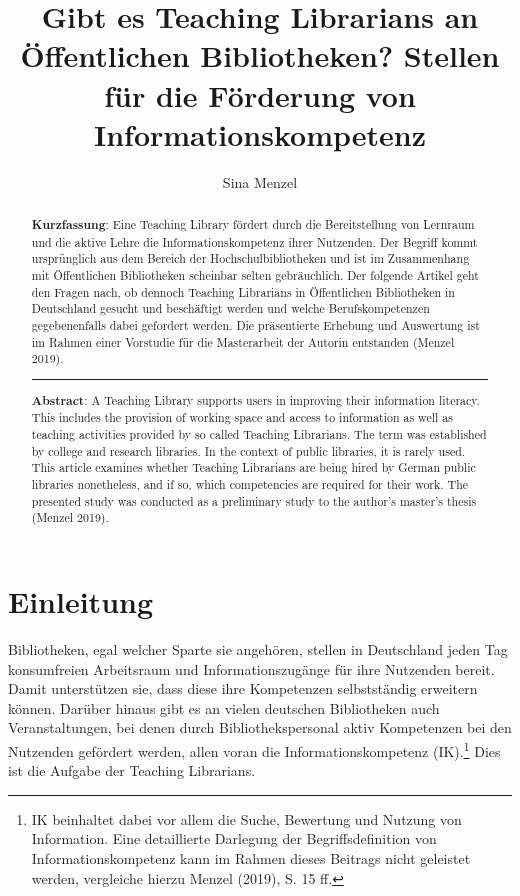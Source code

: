 \documentclass[a4paper,
fontsize=11pt,
oneside,
numbers=noperiodatend,
parskip=half-,
bibliography=totoc,
final
]{scrartcl}
\title{\LARGE{Gibt es Teaching Librarians an Öffentlichen Bibliotheken? Stellen für die Förderung von Informationskompetenz}}%
\author{Sina Menzel} %
\date{}
\begin{document}
\maketitle
\thispagestyle{fancyplain} 

\begin{abstract}
\noindent
\textbf{Kurzfassung}: Eine Teaching Library fördert durch die
Bereitstellung von Lernraum und die aktive Lehre die
Informationskompetenz ihrer Nutzenden. Der Begriff \linebreak kommt ursprünglich
aus dem Bereich der Hochschulbibliotheken und ist im Zusammenhang mit
Öffentlichen Bibliotheken scheinbar selten gebräuchlich. Der folgende
Artikel geht den Fragen nach, ob dennoch Teaching Librarians in
Öffentlichen Bibliotheken in Deutschland gesucht und beschäftigt werden
und welche Berufskompetenzen gegebenenfalls dabei gefordert werden. Die
präsentierte Erhebung und Auswertung ist im Rahmen einer Vorstudie für
die Masterarbeit der Autorin entstanden (Menzel 2019).

\begin{center}\rule{0.5\linewidth}{0.5pt}\end{center}

\noindent\textbf{Abstract}: A Teaching Library supports users in improving their
information literacy. This includes the provision of working space and
access to information as well as teaching activities provided by so
called Teaching Librarians. The term was established by college and
research libraries. In the context of public libraries, it is rarely
used. This article examines whether Teaching Librarians are being hired
by German public libraries nonetheless, and if so, which competencies
are required for their work. The presented study was conducted as a
preliminary study to the author's master's thesis (Menzel 2019).
\end{abstract}

\hypertarget{einleitung}{%
\section{Einleitung}\label{einleitung}}

Bibliotheken, egal welcher Sparte sie angehören, stellen in Deutschland
jeden Tag konsumfreien Arbeitsraum und Informationszugänge für ihre
Nutzenden bereit. Damit unterstützen sie, dass diese ihre Kompetenzen
selbstständig erweitern können. Darüber hinaus gibt es an vielen
deutschen Bibliotheken auch Veranstaltungen, bei denen durch
Bibliothekspersonal aktiv Kompetenzen bei den Nutzenden gefördert
werden, allen voran die Informationskompetenz (IK).\footnote{IK
  beinhaltet dabei vor allem die Suche, Bewertung und Nutzung von
  Information. Eine detaillierte Darlegung der Begriffsdefinition von
  Informationskompetenz kann im Rahmen dieses Beitrags nicht geleistet
  werden, vergleiche hierzu Menzel (2019), S. 15 ff.} Dies ist die
Aufgabe der Teaching Librarians.
\end{document}
